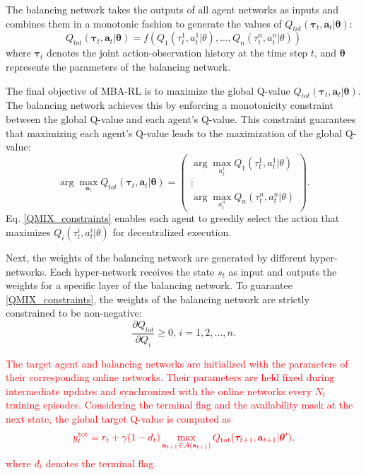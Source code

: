 \documentclass[journal]{IEEEtran}
\newcommand{\newrev}[1]{\textcolor{red}{#1}}
\begin{document}
The balancing network takes the outputs of all agent networks as inputs and combines them in a monotonic fashion to generate the values of $Q_{tot}(\boldsymbol{\tau}_t, \mathbf{a}_t|\bm{\theta})$:
\begin{equation}\label{Q-value}
    Q_{tot}(\boldsymbol{\tau}_t, \mathbf{a}_t|\bm{\theta}) = f(Q_1(\tau_t^1, a_t^1|\theta), ..., Q_n(\tau_t^n, a_t^n|\theta))
\end{equation}
where $\boldsymbol{\tau}_t$ denotes the joint action-observation history at the time step $t$, and $\bm{\theta}$ represents the parameters of the balancing network. 

The final objective of MBA-RL is to maximize the global Q-value $Q_{tot}(\boldsymbol{\tau}_t, \mathbf{a}_t|\bm{\theta})$. The balancing network achieves this by enforcing a monotonicity constraint between the global Q-value and each agent’s Q-value. This constraint guarantees that maximizing each agent’s Q-value leads to the maximization of the global Q-value:
\begin{equation}\label{QMIX_constraints}
\arg\max_{\mathbf{a}_t} Q_{tot}(\boldsymbol{\tau}_t, \mathbf{a}_t|\bm{\theta}) =
\begin{pmatrix}
\arg\max_{a_t^1} Q_1(\tau_t^1, a_t^1|\theta) \\
\vdots \\
\arg\max_{a_t^n} Q_n(\tau_t^n, a_t^n|\theta)
\end{pmatrix}.
\end{equation}
Eq. \eqref{QMIX_constraints} enables each agent to greedily select the action that maximizes $Q_i(\tau_t^i, a_t^i|\theta)$ for decentralized execution. 

Next, the weights of the balancing network are generated by different hyper-networks. Each hyper-network receives the state $s_t$ as input and outputs the weights for a specific layer of the balancing network. To guarantee \eqref{QMIX_constraints}, the weights of the balancing network are strictly constrained to be non-negative:
\begin{equation}\label{QMIX_constraints_1}
\frac{\partial Q_{tot}}{\partial Q_i} \geq 0, \, i = 1, 2, ..., n.
\end{equation}

\newrev{The target agent and balancing networks are initialized with the parameters of their corresponding online networks. Their parameters are held fixed during intermediate updates and synchronized with the online networks every $N_t$ training episodes. Considering the terminal flag and the availability mask at the next state, the global target Q-value is computed as}
\begin{equation}\label{target Q}
\newrev{y_t^{\text{tot}} = r_t + \gamma(1-d_t) \max_{\mathbf{a}_{t+1}\in\mathcal{A}(\mathbf{s}_{t+1})} Q_{\text{tot}}(\boldsymbol{\tau}_{t+1}, \mathbf{a}_{t+1}|\bm{\theta}'),}
\end{equation}
\newrev{where $d_t$ denotes the terminal flag.}
\end{document}
